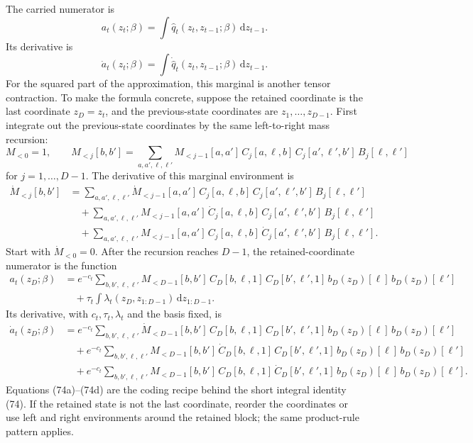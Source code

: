 \documentclass[11pt]{article}
\theoremstyle{remark}
\newcommand{\dd}{\,\mathrm d}
\begin{document}
The carried numerator is
\[
    a_t(z_t;\beta)
    =
    \int \widehat q_t(z_t,z_{t-1};\beta)\dd z_{t-1}.
    \tag{73}
\]
Its derivative is
\[
    \dot a_t(z_t;\beta)
    =
    \int \dot{\widehat q}_t(z_t,z_{t-1};\beta)\dd z_{t-1}.
    \tag{74}
\]
For the squared part of the approximation, this marginal is another tensor
contraction.  To make the formula concrete, suppose the retained coordinate is
the last coordinate \(z_D=z_t\), and the previous-state coordinates are
\(z_1,\ldots,z_{D-1}\).  First integrate out the previous-state coordinates by
the same left-to-right mass recursion:
\[
    M_{<0}=1,
    \qquad
    M_{<j}[b,b']
    =
    \sum_{a,a',\ell,\ell'}
    M_{<j-1}[a,a']\,
    C_j[a,\ell,b]\,
    C_j[a',\ell',b']\,
    B_j[\ell,\ell']
    \tag{74a}
\]
for \(j=1,\ldots,D-1\).  The derivative of this marginal environment is
\[
\begin{aligned}
    \dot M_{<j}[b,b']
    &=
    \sum_{a,a',\ell,\ell'}
    \dot M_{<j-1}[a,a']\,
    C_j[a,\ell,b]\,
    C_j[a',\ell',b']\,
    B_j[\ell,\ell']\\
    &\quad+
    \sum_{a,a',\ell,\ell'}
    M_{<j-1}[a,a']\,
    \dot C_j[a,\ell,b]\,
    C_j[a',\ell',b']\,
    B_j[\ell,\ell']\\
    &\quad+
    \sum_{a,a',\ell,\ell'}
    M_{<j-1}[a,a']\,
    C_j[a,\ell,b]\,
    \dot C_j[a',\ell',b']\,
    B_j[\ell,\ell'].
\end{aligned}
    \tag{74b}
\]
Start with \(\dot M_{<0}=0\).  After the recursion reaches \(D-1\), the
retained-coordinate numerator is the function
\[
\begin{aligned}
    a_t(z_D;\beta)
    &=
    e^{-c_t}
    \sum_{b,b',\ell,\ell'}
    M_{<D-1}[b,b']\,
    C_D[b,\ell,1]\,
    C_D[b',\ell',1]\,
    b_D(z_D)[\ell]\,
    b_D(z_D)[\ell']\\
    &\quad+
    \tau_t
    \int \lambda_t(z_D,z_{1:D-1})\dd z_{1:D-1}.
\end{aligned}
    \tag{74c}
\]
Its derivative, with \(c_t,\tau_t,\lambda_t\) and the basis fixed, is
\[
\begin{aligned}
    \dot a_t(z_D;\beta)
    &=
    e^{-c_t}
    \sum_{b,b',\ell,\ell'}
    \dot M_{<D-1}[b,b']\,
    C_D[b,\ell,1]\,
    C_D[b',\ell',1]\,
    b_D(z_D)[\ell]\,
    b_D(z_D)[\ell']\\
    &\quad+
    e^{-c_t}
    \sum_{b,b',\ell,\ell'}
    M_{<D-1}[b,b']\,
    \dot C_D[b,\ell,1]\,
    C_D[b',\ell',1]\,
    b_D(z_D)[\ell]\,
    b_D(z_D)[\ell']\\
    &\quad+
    e^{-c_t}
    \sum_{b,b',\ell,\ell'}
    M_{<D-1}[b,b']\,
    C_D[b,\ell,1]\,
    \dot C_D[b',\ell',1]\,
    b_D(z_D)[\ell]\,
    b_D(z_D)[\ell'].
\end{aligned}
    \tag{74d}
\]
Equations (74a)--(74d) are the coding recipe behind the short integral
identity (74).  If the retained state is not the last coordinate, reorder the
coordinates or use left and right environments around the retained block; the
same product-rule pattern applies.
\end{document}
